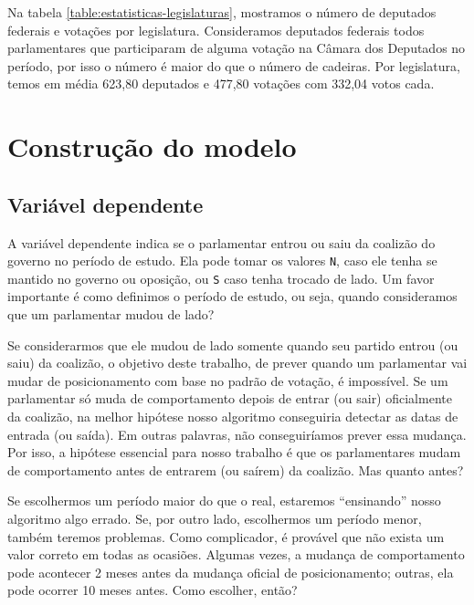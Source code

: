 \documentclass[a4paper,titlepage]{ppgi}\usepackage[]{graphicx}\usepackage[]{color}
\begin{document}
Na tabela \ref{table:estatisticas-legislaturas}, mostramos o número de
deputados federais e votações por legislatura. Consideramos deputados federais
todos parlamentares que participaram de alguma votação na Câmara dos Deputados
no período, por isso o número é maior do que o número de cadeiras. Por
legislatura, temos em média 623,80 deputados e
477,80 votações com 332,04 votos cada.

\section{Construção do modelo}


\subsection{Variável dependente}

A variável dependente indica se o parlamentar entrou ou saiu da coalizão do
governo no período de estudo. Ela pode tomar os valores \verb|N|, caso ele
tenha se mantido no governo ou oposição, ou \verb|S| caso tenha trocado de
lado. Um favor importante é como definimos o período de estudo, ou seja, quando
consideramos que um parlamentar mudou de lado?

Se considerarmos que ele mudou de lado somente quando seu partido entrou (ou
saiu) da coalizão, o objetivo deste trabalho, de prever quando um parlamentar
vai mudar de posicionamento com base no padrão de votação, é impossível. Se um
parlamentar só muda de comportamento depois de entrar (ou sair) oficialmente da
coalizão, na melhor hipótese nosso algoritmo conseguiria detectar as datas de
entrada (ou saída). Em outras palavras, não conseguiríamos prever essa mudança.
Por isso, a hipótese essencial para nosso trabalho é que os parlamentares mudam
de comportamento antes de entrarem (ou saírem) da coalizão. Mas quanto antes?

Se escolhermos um período maior do que o real, estaremos ``ensinando'' nosso
algoritmo algo errado. Se, por outro lado, escolhermos um período menor, também
teremos problemas. Como complicador, é provável que não exista um valor correto
em todas as ocasiões. Algumas vezes, a mudança de comportamento pode acontecer
2 meses antes da mudança oficial de posicionamento; outras, ela pode ocorrer 10
meses antes. Como escolher, então?
\end{document}
